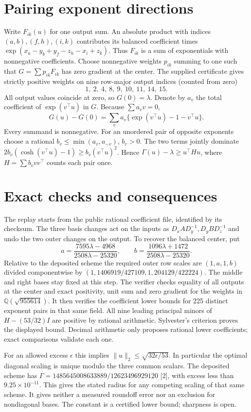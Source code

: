 \documentclass[11pt]{article}
\begin{document}
\section{Pairing exponent directions}
Write $F_{ik}(u)$ for one output sum. An absolute product with indices $(a,b),(f,h),(i,k)$ contributes its balanced coefficient times
$\exp(x_a-y_b+y_f-z_h-x_i+z_k)$. Thus $F_{ik}$ is a sum of exponentials with nonnegative coefficients. Choose nonnegative weights $p_{ik}$ summing to one such that $G=\sum p_{ik}F_{ik}$ has zero gradient at the center. The supplied certificate gives strictly positive weights on nine row-major output indices (counted from zero)
\[
  1,\ 2,\ 4,\ 8,\ 9,\ 10,\ 11,\ 14,\ 15 .
\]
All output values coincide at zero, so $G(0)=\lambda$. Denote by $a_v$ the total coefficient of $\exp(v^\top u)$ in $G$. Because $\sum a_v v=0$,
\[
 G(u)-G(0)=\sum_v a_v\{\exp(v^\top u)-1-v^\top u\}.
\]
Every summand is nonnegative. For an unordered pair of opposite exponents choose a rational $b_v\leq\min(a_v,a_{-v})$, $b_v>0$. The two terms jointly dominate $2b_v(\cosh(v^\top u)-1)\ge b_v(v^\top u)^2$. Hence $\Gamma(u)-\lambda\ge u^\top H u$, where $H=\sum b_v vv^\top$ counts each pair once.

\section{Exact checks and consequences}
The replay starts from the public rational coefficient file, identified by its checksum. The three basis changes act on the inputs as $D_x A D_y^{-1},D_y B D_z^{-1}$ and undo the two outer changes on the output. To recover the balanced center, put
\[
 a=\frac{7595\lambda-4968}{2508\lambda-25320},\qquad
 b=\frac{1096\lambda+1472}{2508\lambda-25320}.
\]
Relative to the deposited scheme the required outer row scales are $(1,a,1,b)$ divided componentwise by $(1,1406919/427109,1,204129/422224)$. The middle and right bases stay fixed at this step. The verifier checks equality of all outputs at the center and exact positivity, unit sum and zero gradient for the weights in $\mathbb Q(\sqrt{955614})$. It then verifies the coefficient lower bounds for 225 distinct exponent pairs in that same field. All nine leading principal minors of $H-(53/32)I$ are positive by rational arithmetic. Sylvester's criterion proves the displayed bound. Decimal arithmetic only proposes rational lower coefficients; exact comparisons validate each one.

For an allowed excess $\epsilon$ this implies $\|u\|_2\leq\sqrt{32\epsilon/53}$. In particular the optimal diagonal scaling is unique modulo the three common scalars. The deposited scheme has $\Gamma=1485645008633889/12623496929120$ [2], with excess less than $9.25\times10^{-11}$. This gives the stated radius for any competing scaling of that same scheme. It gives neither a measured roundoff error nor an exclusion for nondiagonal bases. The constant is a certified lower bound; sharpness is open.
\end{document}
